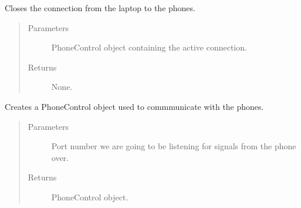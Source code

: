 \documentclass[letterpaper,10pt,english]{sphinxmanual}
\begin{document}

\begin{fulllineitems}
\label{\detokenize{index:src.Controllers.Program_Controller.close_conn}}
Closes the connection from the laptop to the phones.
\begin{quote}\begin{description}
\item[{Parameters}] \leavevmode
{} \textendash{} PhoneControl object containing the active connection.

\item[{Returns}] \leavevmode
None.

\end{description}\end{quote}

\end{fulllineitems}


\begin{fulllineitems}
\label{\detokenize{index:src.Controllers.Program_Controller.createPhoneConnection}}
Creates a PhoneControl object used to commmunicate with the phones.
\begin{quote}\begin{description}
\item[{Parameters}] \leavevmode
{} \textendash{} Port number we are going to be listening for signals from the phone over.

\item[{Returns}] \leavevmode
PhoneControl object.

\end{description}\end{quote}

\end{fulllineitems}
\end{document}
